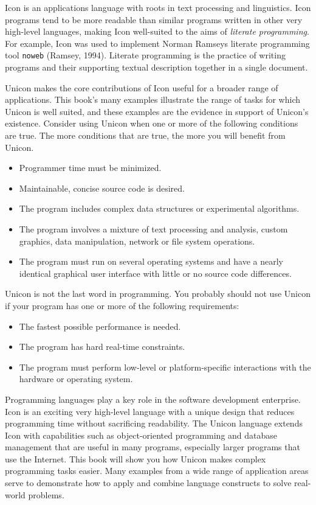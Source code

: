 Icon is an applications language with roots in text
processing and linguistics. Icon programs tend to be more readable than
similar programs written in other very high-level languages, making
Icon well-suited to the aims of \textit{literate programming}. For example, Icon was used
to implement Norman Ramsey{\textquotesingle}s literate
programming tool \texttt{noweb} (Ramsey, 1994). Literate programming is
the practice of writing programs and their supporting textual
description together in a single document.

Unicon makes the core contributions of Icon useful
for a broader range of applications. This book's many
examples illustrate the range of tasks for which Unicon is well
suited, and these examples are the evidence in
support of Unicon's existence.
Consider using Unicon when one or more of the following conditions are
true. The more conditions that are true, the more you will
benefit from Unicon.

\begin{itemize}
\item Programmer time must be minimized.
\item Maintainable, concise source code is desired.
\item The program includes complex data structures or experimental
algorithms.
\item The program involves a mixture of text processing and analysis, custom
graphics, data manipulation, network or file system operations.
\item The program must run on several operating systems and have a
nearly identical graphical user interface with little or no source code
differences.
\end{itemize}

Unicon is not the last word in programming. You probably should not use
Unicon if your program has one or more of the following requirements:

\begin{itemize}
\item The fastest possible performance is needed.
\item The program has hard real-time constraints.
\item The program must perform low-level or platform-specific
interactions with the hardware or operating system.
\end{itemize}

Programming languages play a key role in the software development
enterprise. Icon is an exciting very high-level language with a unique
design that reduces programming time without sacrificing readability.
The Unicon language extends Icon with capabilities such as
object-oriented programming and
database management that are useful in many programs, especially larger
programs that use the Internet. This book will show you how Unicon
makes complex programming tasks easier. Many examples from a wide range
of application areas serve to demonstrate how to apply and combine
language constructs to solve real-world problems.

